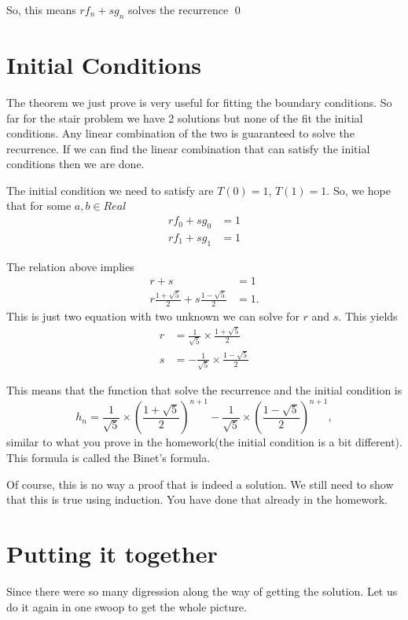 \documentclass[a4paper, 12pt]{article}
\newcommand{\qedd}{\qed\newline}
\begin{document}
So, this means $r f_n + s g_n$ solves the recurrence
\qedd
\begin{multicols}{2}

\section*{Initial Conditions}

The theorem we just prove is very useful for fitting the boundary conditions. So far for the stair problem we have 2 solutions but none of the fit the initial conditions. Any linear combination of the two is guaranteed to solve the recurrence. If we can find the linear combination that can satisfy the initial conditions then we are done.

The initial condition we need to satisfy are $T(0)=1$, $T(1)=1$. So, we hope that for some $a, b \in Real$
\begin{align*}
	r f_0 + s g_0 &= 1\\
	r f_1 + s g_1 &= 1
\end{align*}

The relation above implies
\begin{align}
	r + s &= 1\\
	r \frac{1 + \sqrt{5}}{2} + s \frac{1 - \sqrt{5}}{2}  &= 1.
\end{align}
This is just two equation with two unknown we can solve for $r$ and $s$. This yields
\begin{align*}
r &= \frac{1}{\sqrt{5}}\times \frac{1 + \sqrt{5}}{2}\\
s &= -\frac{1}{\sqrt{5}}\times \frac{1 - \sqrt{5}}{2}
\end{align*}

This means that the function that solve the recurrence and the initial condition is
\[
	h_n = \frac{1}{\sqrt{5}}\times \left(\frac{1 + \sqrt{5}}{2}\right)^{n+1} - \frac{1}{\sqrt{5}}\times \left(\frac{1 - \sqrt{5}}{2}\right)^{n+1},
\]
similar to what you prove in the homework(the initial condition is a bit different). This formula is called the Binet's formula.

Of course, this is no way a proof that is indeed a solution. We still need to show that this is true using induction. You have done that already in the homework.

\section*{Putting it together}
Since there were so many digression along the way of getting the solution. Let us do it again in one swoop to get the whole picture.


\end{multicols}
\end{document}

